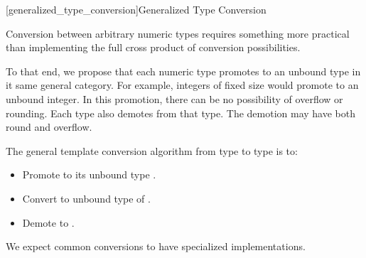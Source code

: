 
\begin{addedblock}
[generalized_type_conversion]{Generalized Type Conversion}

Conversion between arbitrary numeric types requires something more practical than implementing the full cross product of conversion possibilities.

To that end, we propose that each numeric type promotes to an unbound type in it same general category. For example, integers of fixed size would promote to an unbound integer. In this promotion, there can be no possibility of overflow or rounding. Each type also demotes from that type. The demotion may have both round and overflow.

The general template conversion algorithm from type  to type  is to:

\begin{itemize}
\item Promote  to its unbound type .
\item Convert  to unbound type  of .
\item Demote  to .
\end{itemize}

We expect common conversions to have specialized implementations.

\end{addedblock}
